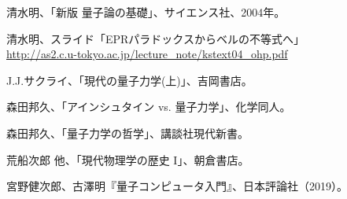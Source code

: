 \documentclass[10pt,b5paper,papersize,dvipdfmx]{jsbook}
\begin{document}

\clearpage

\begin{thebibliography}{99}
  \item 清水明、「新版 量子論の基礎」、サイエンス社、2004年。
  \item 清水明、スライド「EPRパラドックスからベルの不等式へ」\\
  \url{http://as2.c.u-tokyo.ac.jp/lecture_note/kstext04_ohp.pdf}
  \item J.J.サクライ、「現代の量子力学(上)」、吉岡書店。
  \item 森田邦久、「アインシュタイン vs. 量子力学」、化学同人。
  \item 森田邦久、「量子力学の哲学」、講談社現代新書。
  \item 荒船次郎 他、「現代物理学の歴史 I」、朝倉書店。
  \item 宮野健次郎、古澤明『量子コンピュータ入門』、日本評論社（2019）。
\end{thebibliography}
\end{document}
